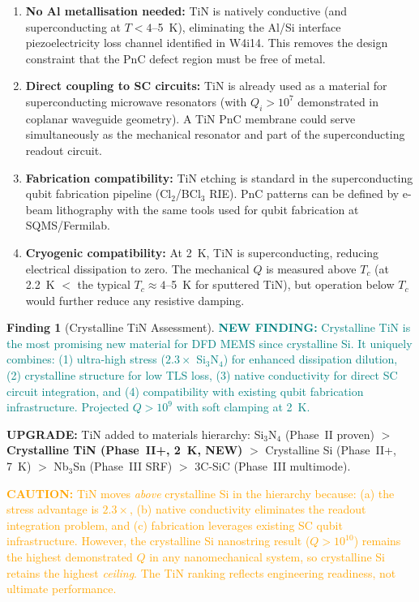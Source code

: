 \documentclass[11pt]{article}
\theoremstyle{definition}
\newtheorem{finding}[theorem]{Finding}
\theoremstyle{remark}
\newcommand{\caution}[1]{\textcolor{orange}{\textbf{CAUTION:} #1}}
\newcommand{\newfinding}[1]{\textcolor{teal}{\textbf{NEW FINDING:} #1}}
\newcommand{\upgrade}[1]{\textcolor{blue!70!black}{\textbf{UPGRADE:} #1}}
\begin{document}
\begin{enumerate}[nosep]
\item \textbf{No Al metallisation needed:} TiN is natively
  conductive (and superconducting at $T < 4$--5~K), eliminating
  the Al/Si interface piezoelectricity loss channel identified in
  W4i14. This removes the design constraint that the PnC defect
  region must be free of metal.
\item \textbf{Direct coupling to SC circuits:} TiN is already used
  as a material for superconducting microwave resonators (with
  $Q_i > 10^7$ demonstrated in coplanar waveguide geometry). A
  TiN PnC membrane could serve simultaneously as the mechanical
  resonator and part of the superconducting readout circuit.
\item \textbf{Fabrication compatibility:} TiN etching is standard
  in the superconducting qubit fabrication pipeline (Cl$_2$/BCl$_3$
  RIE). PnC patterns can be defined by e-beam lithography with
  the same tools used for qubit fabrication at SQMS/Fermilab.
\item \textbf{Cryogenic compatibility:} At 2~K, TiN is
  superconducting, reducing electrical dissipation to zero.
  The mechanical $Q$ is measured above $T_c$ (at 2.2~K $<$ the
  typical $T_c \approx 4$--5~K for sputtered TiN), but operation
  below $T_c$ would further reduce any resistive damping.
\end{enumerate}

\begin{finding}[Crystalline TiN Assessment]
\label{find:tin_assessment}
\newfinding{Crystalline TiN is the most promising new material
for DFD MEMS since crystalline Si. It uniquely combines: (1)
ultra-high stress ($2.3\times$ Si$_3$N$_4$) for enhanced
dissipation dilution, (2) crystalline structure for low TLS loss,
(3) native conductivity for direct SC circuit integration, and
(4) compatibility with existing qubit fabrication infrastructure.
Projected $Q > 10^9$ with soft clamping at 2~K.}

\upgrade{TiN added to materials hierarchy:
Si$_3$N$_4$ (Phase~II proven) $>$ \textbf{Crystalline TiN
(Phase~II+, 2~K, NEW)} $>$ Crystalline Si (Phase~II+, 7~K) $>$
Nb$_3$Sn (Phase~III SRF) $>$ 3C-SiC (Phase~III multimode).}

\caution{TiN moves \textit{above} crystalline Si in the hierarchy
because: (a) the stress advantage is $2.3\times$, (b) native
conductivity eliminates the readout integration problem, and (c)
fabrication leverages existing SC qubit infrastructure. However,
the crystalline Si nanostring result ($Q > 10^{10}$) remains the
highest demonstrated $Q$ in any nanomechanical system, so
crystalline Si retains the highest \textit{ceiling}. The TiN
ranking reflects engineering readiness, not ultimate performance.}
\end{finding}
\end{document}
